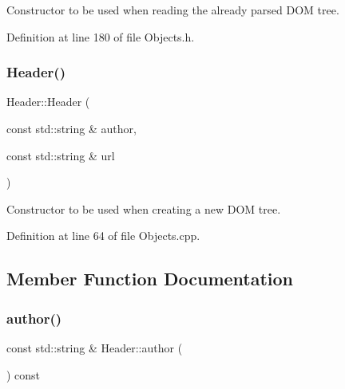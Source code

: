 Constructor to be used when reading the already parsed D\+OM tree. 



Definition at line 180 of file Objects.\+h.

\hypertarget{class_d_d4hep_1_1_geometry_1_1_header_a859f265a918b1b746037be9acc1f284f}{}\label{class_d_d4hep_1_1_geometry_1_1_header_a859f265a918b1b746037be9acc1f284f} 
\subsubsection{\texorpdfstring{Header()}{Header()}\hspace{0.1cm}{\footnotesize\ttfamily [4/4]}}
{\footnotesize\ttfamily Header\+::\+Header (\begin{DoxyParamCaption}\item[{const std\+::string \&}]{author,  }\item[{const std\+::string \&}]{url }\end{DoxyParamCaption})}



Constructor to be used when creating a new D\+OM tree. 



Definition at line 64 of file Objects.\+cpp.



\subsection{Member Function Documentation}
\hypertarget{class_d_d4hep_1_1_geometry_1_1_header_adfdf3966395650c581b177d1d238a398}{}\label{class_d_d4hep_1_1_geometry_1_1_header_adfdf3966395650c581b177d1d238a398} 
\subsubsection{\texorpdfstring{author()}{author()}}
{\footnotesize\ttfamily const std\+::string \& Header\+::author (\begin{DoxyParamCaption}{ }\end{DoxyParamCaption}) const}



